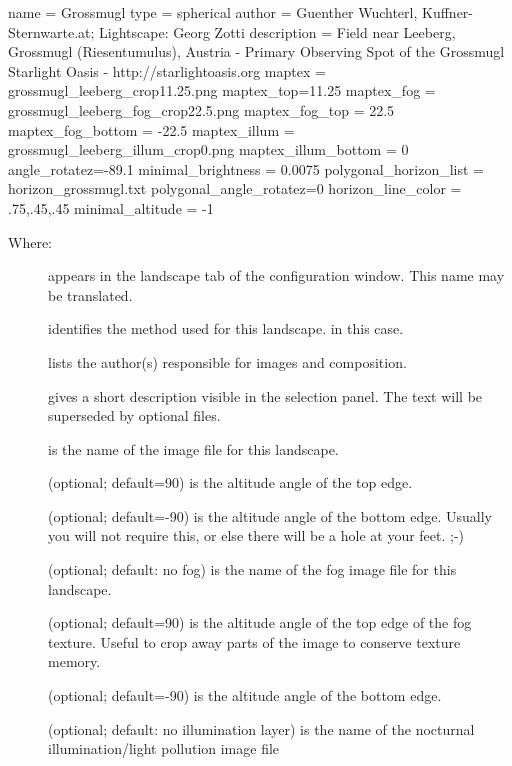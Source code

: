 \begin{configfile}
[landscape]
name = Grossmugl
type = spherical
author = Guenther Wuchterl, Kuffner-Sternwarte.at; 
         Lightscape: Georg Zotti
description = Field near Leeberg, Grossmugl (Riesentumulus), 
              Austria - Primary Observing Spot of the Grossmugl 
              Starlight Oasis - http://starlightoasis.org
maptex = grossmugl_leeberg_crop11.25.png
maptex_top=11.25 
maptex_fog = grossmugl_leeberg_fog_crop22.5.png
maptex_fog_top = 22.5
maptex_fog_bottom = -22.5
maptex_illum = grossmugl_leeberg_illum_crop0.png
maptex_illum_bottom = 0
angle_rotatez=-89.1
minimal_brightness = 0.0075
polygonal_horizon_list = horizon_grossmugl.txt
polygonal_angle_rotatez=0
horizon_line_color =  .75,.45,.45
minimal_altitude = -1
\end{configfile}
Where:
\begin{description}
\item[] appears in the landscape tab of the configuration window. This name may be translated.
\item[] identifies the method used for this
  landscape.  in this case.
\item[] lists the author(s) responsible for images and
  composition.
\item[] gives a short description visible in the
  selection panel. The text will be superseded by optional
   files.
\item[] is the name of the image file for this landscape.
\item[] (optional; default=90) is the altitude angle
  of the top edge.
\item[] (optional; default=-90) is the altitude
  angle of the bottom edge. Usually you will not require this, or else
  there will be a hole at your feet. ;-)
\item[] (optional; default: no fog) is the name of
  the fog image file for this landscape.
\item[] (optional; default=90) is the altitude
  angle of the top edge of the fog texture. Useful to crop away parts
  of the image to conserve texture memory.
\item[] (optional; default=-90) is the
  altitude angle of the bottom edge.
\item[] (optional; default: no illumination layer)
  is the name of the nocturnal illumination/light pollution image file

\end{description}
